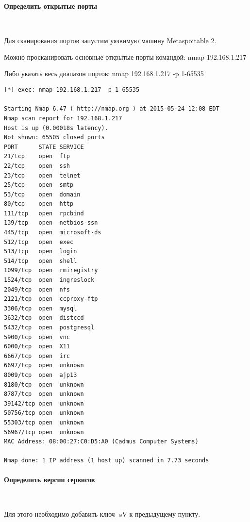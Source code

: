 \documentclass{article}
\begin{document}
\paragraph{Определить открытые порты}
~

Для сканирования портов запустим уязвимую машину Metaspoitable 2.

Можно просканировать основные открытые порты командой: nmap 192.168.1.217

Либо указать весь диапазон портов: nmap 192.168.1.217 -p 1-65535

\begin{verbatim}
[*] exec: nmap 192.168.1.217 -p 1-65535

Starting Nmap 6.47 ( http://nmap.org ) at 2015-05-24 12:08 EDT
Nmap scan report for 192.168.1.217
Host is up (0.00018s latency).
Not shown: 65505 closed ports
PORT      STATE SERVICE
21/tcp    open  ftp
22/tcp    open  ssh
23/tcp    open  telnet
25/tcp    open  smtp
53/tcp    open  domain
80/tcp    open  http
111/tcp   open  rpcbind
139/tcp   open  netbios-ssn
445/tcp   open  microsoft-ds
512/tcp   open  exec
513/tcp   open  login
514/tcp   open  shell
1099/tcp  open  rmiregistry
1524/tcp  open  ingreslock
2049/tcp  open  nfs
2121/tcp  open  ccproxy-ftp
3306/tcp  open  mysql
3632/tcp  open  distccd
5432/tcp  open  postgresql
5900/tcp  open  vnc
6000/tcp  open  X11
6667/tcp  open  irc
6697/tcp  open  unknown
8009/tcp  open  ajp13
8180/tcp  open  unknown
8787/tcp  open  unknown
39142/tcp open  unknown
50756/tcp open  unknown
55303/tcp open  unknown
56967/tcp open  unknown
MAC Address: 08:00:27:C0:D5:A0 (Cadmus Computer Systems)

Nmap done: 1 IP address (1 host up) scanned in 7.73 seconds
\end{verbatim}


\paragraph{Определить версии сервисов}
~

Для этого необходимо добавить ключ -sV к предыдущему пункту.
\end{document}
